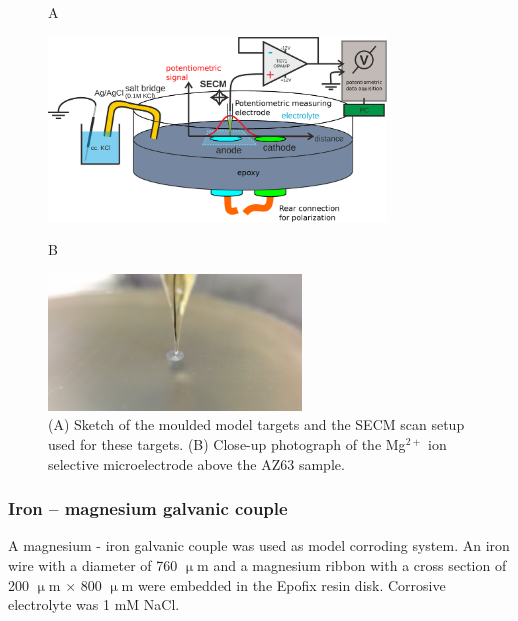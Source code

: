 \begin{figure}
\centering

\begin{flushleft}
\hspace{1.5cm} A
\end{flushleft}

\includegraphics[width=0.8\textwidth]{img/model.eps}\vspace{5mm}

\begin{flushleft}
\hspace{1.5cm} B
\end{flushleft}

\includegraphics[width=0.6\textwidth]{img/model_photo.jpg}
\caption[Sketch of the moulded model targets and the SECM scan setup used for these targets.]{(A) Sketch of the moulded model targets and the SECM scan setup used for these targets. (B) Close-up photograph of the Mg$^{2+}$ ion selective microelectrode above the AZ63 sample.}
\label{fig:model}
\end{figure}

			\subsubsection{Iron -- magnesium galvanic couple}
A magnesium - iron galvanic couple was used as model corroding system.
An iron wire with a diameter of 760 $\upmu$m and a magnesium ribbon with a cross section of 200 $\upmu$m $\times$ 800 $\upmu$m were embedded in the Epofix resin disk.
Corrosive electrolyte was 1 mM NaCl.

